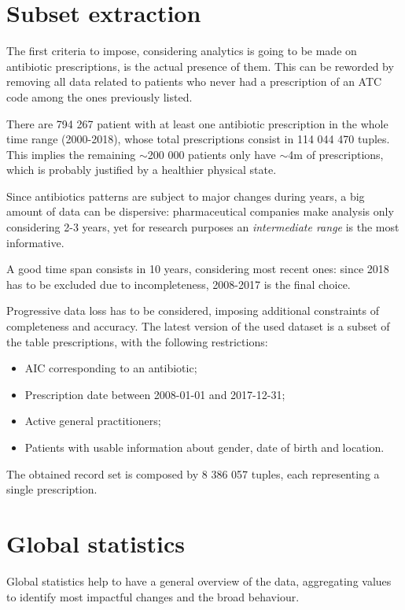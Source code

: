 \section{Subset extraction}
The first criteria to impose, considering analytics is going to be made on antibiotic prescriptions, is the actual presence of them. This can be reworded by removing all data related to patients who never had a prescription of an ATC code among the ones previously listed.

There are 794 267 patient with at least one antibiotic prescription in the whole time range (2000-2018), whose total prescriptions consist in 114 044 470 tuples. This implies the remaining $\sim$200 000 patients only have $\sim$4m of prescriptions, which is probably justified by a healthier physical state.

Since antibiotics patterns are subject to major changes during years, a big amount of data can be dispersive: pharmaceutical companies make analysis only considering 2-3 years, yet for research purposes an \textit{intermediate range} is the most informative. 

A good time span consists in 10 years, considering most recent ones: since 2018 has to be excluded due to incompleteness, 2008-2017 is the final choice.

Progressive data loss has to be considered, imposing additional constraints of completeness and accuracy. The latest version of the used dataset is a subset of the table prescriptions, with the following restrictions:
\begin{itemize}
	\item AIC corresponding to an antibiotic;
	\item Prescription date between 2008-01-01 and 2017-12-31;
	\item Active general practitioners;
	\item Patients with usable information about gender, date of birth and location.
\end{itemize}

The obtained record set is composed by 8 386 057 tuples, each representing a single prescription.

\section{Global statistics}
Global statistics help to have a general overview of the data, aggregating values to identify most impactful changes and the broad behaviour.

